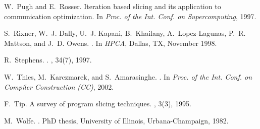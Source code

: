 \documentclass{sig-alternate}
\begin{document}
{\begin{thebibliography}{10}
W.~Pugh and E.~Rosser.
\newblock Iteration based slicing and its application to communication
  optimization.
\newblock In {\em Proc. of the Int. Conf. on Supercomputing}, 1997.

S.~Rixner, W.~J. Dally, U.~J. Kapani, B.~Khailany, A.~Lopez-Lagunas, P.~R.
  Mattson, and J.~D. Owens.
.
\newblock In {\em HPCA}, Dallas, TX, November 1998.

R.~Stephens.
.
, 34(7), 1997.

W.~Thies, M.~Karczmarek, and S.~Amarasinghe.
.
\newblock In {\em {Proc. of the Int. Conf. on Compiler Construction (CC)}},
  {2002}.

F.~Tip.
\newblock A survey of program slicing techniques.
, 3(3), 1995.

M.~Wolfe.
.
\newblock PhD thesis, University of Illinois, Urbana-Champaign, 1982.

\end{thebibliography}

}
\end{document}

